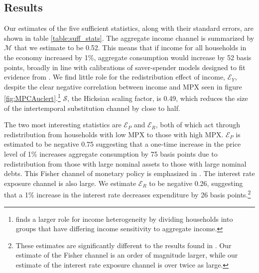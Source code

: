 \documentclass[titlepage]{\econtex}\newcommand{\texname}{ConsumptionHeterogeneity}
\begin{document}
\subsection{Results}
Our estimates of the five sufficient statistics, along with their standard errors, are shown in table \ref{table:suff_stats}. The aggregate income channel is summarized by $\mathcal{M}$ that we estimate to be 0.52. This means that if income for all households in the economy increased by 1\%, aggregate consumption would increase by 52 basis points, broadly in line with calibrations of saver-spender models designed to fit evidence from \cite{campbell_consumption_1989}. We find little role for the redistribution effect of income, $\mathcal{E}_Y$, despite the clear negative correlation between income and MPX seen in figure \ref{fig:MPCAuclert}.\footnote{\cite{patterson_2019} finds a larger role for income heterogeneity by dividing households into groups that have differing income sensitivity to aggregate income.} $\mathcal{S}$, the Hicksian scaling factor, is 0.49, which reduces the size of the intertemporal substitution channel by close to half.

The two most interesting statistics are $\mathcal{E}_P$ and $\mathcal{E}_R$, both of which act through redistribution from households with low MPX to those with high MPX. $\mathcal{E}_P$ is estimated to be  negative 0.75 suggesting that a one-time increase in the price level of 1\% increases aggregate consumption by 75 basis points due to redistribution from those with large nominal assets to those with large nominal debts. This Fisher channel of monetary policy is emphasized in \cite{doepke_inflation_2006}. The interest rate exposure channel is also large. We estimate  $\mathcal{E}_R$ to be  negative 0.26, suggesting that a 1\% increase in the interest rate decreases expenditure by 26 basis points.\footnote{These estimates are significantly different to the results found in \cite{auclert_monetary_2017}. Our estimate of the Fisher channel is an order of magnitude larger, while our estimate of the interest rate exposure channel is over twice as large.}
\end{document}
